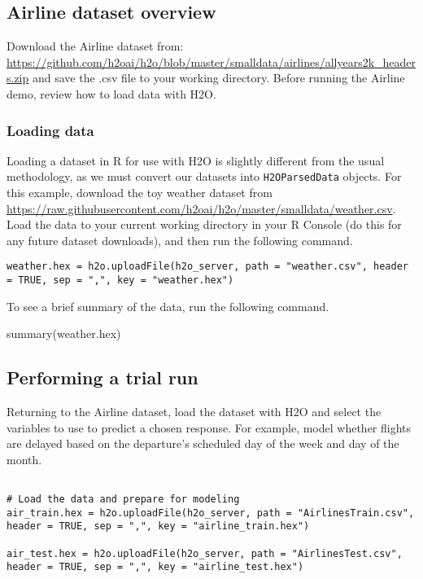 \documentclass{article}[11pt]
\begin{document}
{\subsection{Airline dataset overview} 

Download the Airline dataset from: {\url{https://github.com/h2oai/h2o/blob/master/smalldata/airlines/allyears2k_headers.zip}} and save the .csv file to your working directory. Before running the Airline demo, review how to load data with H2O. 

\subsubsection{Loading data}  

Loading a dataset in R for use with H2O is slightly different from the usual methodology, as we must convert our datasets into \texttt{H2OParsedData} objects. For this example, download the toy weather dataset from {\url{https://raw.githubusercontent.com/h2oai/h2o/master/smalldata/weather.csv}}.  Load the data to your current working directory in your R Console (do this for any future dataset downloads), and then run the following command.
\begin{lstlisting}[breaklines,basicstyle=\ttfamily]
weather.hex = h2o.uploadFile(h2o_server, path = "weather.csv", header = TRUE, sep = ",", key = "weather.hex")
\end{lstlisting}
\bigskip
\noindent
To see a brief summary of the data, run the following command.
\begin{spverbatim}
summary(weather.hex)
\end{spverbatim}


\subsection{Performing a trial run}  
Returning to the Airline dataset, load the dataset with H2O and select the variables to use to predict a chosen response. For example, model whether flights are delayed based on the departure's scheduled day of the week and day of the month.

\begin{lstlisting}[breaklines,basicstyle=\ttfamily]

# Load the data and prepare for modeling
air_train.hex = h2o.uploadFile(h2o_server, path = "AirlinesTrain.csv", header = TRUE, sep = ",", key = "airline_train.hex")

air_test.hex = h2o.uploadFile(h2o_server, path = "AirlinesTest.csv", header = TRUE, sep = ",", key = "airline_test.hex")


\end{lstlisting}}
\end{document}
